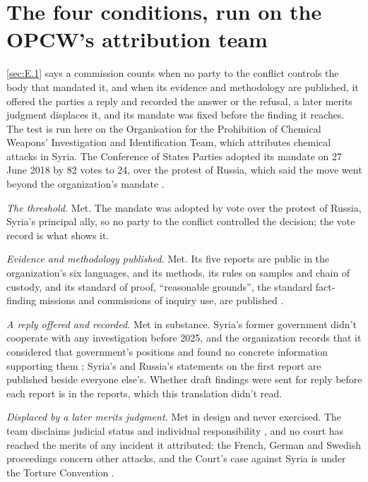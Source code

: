\section{The four conditions, run on the OPCW's attribution team}
\label{sec:E.2}
\ref{sec:E.1} says a commission counts when no party to the conflict controls the body that mandated it, and when its evidence and methodology are published, it offered the parties a reply and recorded the answer or the refusal, a later merits judgment displaces it, and its mandate was fixed before the finding it reaches. The test is run here on the Organisation for the Prohibition of Chemical Weapons' Investigation and Identification Team, which attributes chemical attacks in Syria. The Conference of States Parties adopted its mandate on 27 June 2018 by 82 votes to 24, over the protest of Russia, which said the move went beyond the organization's mandate \autocite{opcw2018attribution,bbc2018opcwblame}.

\emph{The threshold.} Met. The mandate was adopted by vote over the protest of Russia, Syria's principal ally, so no party to the conflict controlled the decision; the vote record is what shows it.

\emph{Evidence and methodology published.} Met. Its five reports are public in the organization's six languages, and its methods, its rules on samples and chain of custody, and its standard of proof, “reasonable grounds”, the standard fact-finding missions and commissions of inquiry use, are published \autocite{opcw2026iitpage}.

\emph{A reply offered and recorded.} Met in substance. Syria's former government didn't cooperate with any investigation before 2025, and the organization records that it considered that government's positions and found no concrete information supporting them \autocite{opcw2026iitkafrzeita}; Syria's and Russia's statements on the first report are published beside everyone else's. Whether draft findings were sent for reply before each report is in the reports, which this translation didn't read.

\emph{Displaced by a later merits judgment.} Met in design and never exercised. The team disclaims judicial status and individual responsibility \autocite{opcw2026iitpage}, and no court has reached the merits of any incident it attributed: the French, German and Swedish proceedings concern other attacks, and the Court's case against Syria is under the Torture Convention \autocite{osji2021frenchcw,icj2023canadasyria}.

